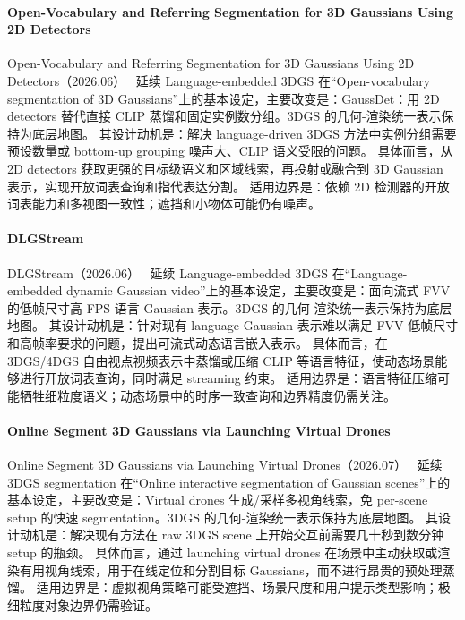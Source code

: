 \paragraph{Open-Vocabulary and Referring Segmentation for 3D Gaussians Using 2D Detectors}
Open-Vocabulary and Referring Segmentation for 3D Gaussians Using 2D Detectors（2026.06）~\cite{2606_30638} 延续 Language-embedded 3DGS 在“Open-vocabulary segmentation of 3D Gaussians”上的基本设定，主要改变是：GaussDet：用 2D detectors 替代直接 CLIP 蒸馏和固定实例数分组。3DGS 的几何-渲染统一表示保持为底层地图。
其设计动机是：解决 language-driven 3DGS 方法中实例分组需要预设数量或 bottom-up grouping 噪声大、CLIP 语义受限的问题。
具体而言，从 2D detectors 获取更强的目标级语义和区域线索，再投射或融合到 3D Gaussian 表示，实现开放词表查询和指代表达分割。
适用边界是：依赖 2D 检测器的开放词表能力和多视图一致性；遮挡和小物体可能仍有噪声。

\paragraph{DLGStream}
DLGStream（2026.06）~\cite{2606_28840} 延续 Language-embedded 3DGS 在“Language-embedded dynamic Gaussian video”上的基本设定，主要改变是：面向流式 FVV 的低帧尺寸高 FPS 语言 Gaussian 表示。3DGS 的几何-渲染统一表示保持为底层地图。
其设计动机是：针对现有 language Gaussian 表示难以满足 FVV 低帧尺寸和高帧率要求的问题，提出可流式动态语言嵌入表示。
具体而言，在 3DGS/4DGS 自由视点视频表示中蒸馏或压缩 CLIP 等语言特征，使动态场景能够进行开放词表查询，同时满足 streaming 约束。
适用边界是：语言特征压缩可能牺牲细粒度语义；动态场景中的时序一致查询和边界精度仍需关注。

\paragraph{Online Segment 3D Gaussians via Launching Virtual Drones}
Online Segment 3D Gaussians via Launching Virtual Drones（2026.07）~\cite{2607_01628} 延续 3DGS segmentation 在“Online interactive segmentation of Gaussian scenes”上的基本设定，主要改变是：Virtual drones 生成/采样多视角线索，免 per-scene setup 的快速 segmentation。3DGS 的几何-渲染统一表示保持为底层地图。
其设计动机是：解决现有方法在 raw 3DGS scene 上开始交互前需要几十秒到数分钟 setup 的瓶颈。
具体而言，通过 launching virtual drones 在场景中主动获取或渲染有用视角线索，用于在线定位和分割目标 Gaussians，而不进行昂贵的预处理蒸馏。
适用边界是：虚拟视角策略可能受遮挡、场景尺度和用户提示类型影响；极细粒度对象边界仍需验证。

